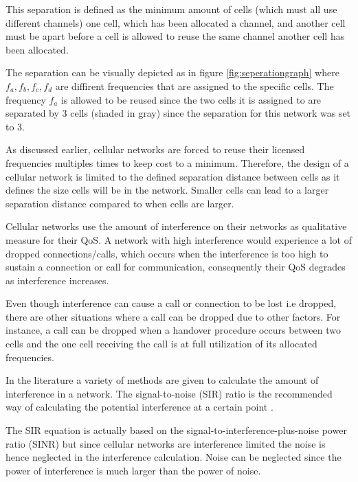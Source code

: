 This separation is defined as the minimum amount of cells (which must all use different channels) one cell, which has been allocated a channel, and another cell must be apart before a cell is allowed to reuse the same channel another cell has been allocated\cite{WirelessCommunications,WirelessDigitalCommunications,Eisenblatter,InterferenceOrientatedFAP}. 

The separation can be visually depicted as in figure \ref{fig:seperationgraph} where $f_a,f_b,f_c,f_d$ are diffirent frequencies that are assigned to the specific cells. The frequency $f_a$ is allowed to be reused since the two cells it is assigned to are separated by 3 cells (shaded in gray) since the separation for this network was set to 3.

As discussed earlier, cellular networks are forced to reuse their licensed frequencies multiples times to keep cost to a minimum. Therefore, the design of a cellular network is limited to the defined separation distance between cells as it defines the size cells will be in the network. Smaller cells can lead to a larger separation distance compared to when cells are larger\cite{WirelessCommunications,WirelessDigitalCommunications,Eisenblatter,InterferenceOrientatedFAP}.

Cellular networks use the amount of interference on their networks as qualitative measure for their QoS. A network with high interference would experience a lot of dropped connections/calls, which occurs when the interference is too high to sustain a connection or call for communication, consequently their QoS degrades as interference increases\cite{WirelessCommunications,WirelessDigitalCommunications}.

Even though interference can cause a call or connection to be lost i.e dropped, there are other situations where a call can be dropped due to other factors. For instance, a call can be dropped when a handover procedure occurs between two cells and the one cell receiving the call is at full utilization of its allocated frequencies\cite{GSMSysEngin,WirelessCommunications,WirelessDigitalCommunications}.

In the literature a variety of methods are given to calculate the amount of interference in a network. The signal-to-noise (SIR) ratio is the recommended way of calculating the potential interference at a certain point \cite{Karen2004}. 

The SIR equation is actually based on the signal-to-interference-plus-noise power ratio (SINR) but since cellular networks are interference limited the noise is hence neglected in the interference calculation\cite{WirelessCommunications}. Noise can be neglected since the power of interference is much larger than the power of noise\cite{WirelessCommunications,WirelessDigitalCommunications}.

